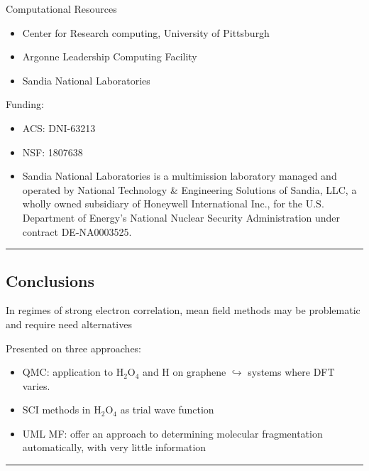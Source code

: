 \documentclass[
  letterpaper,
  DIV=11,
  numbers=noendperiod]{scrartcl}
\providecommand{\tightlist}{%
  \setlength{\itemsep}{0pt}\setlength{\parskip}{0pt}}\usepackage{longtable,booktabs,array}
\begin{document}
Computational Resources

\begin{itemize}
\tightlist
\item
  Center for Research computing, University of Pittsburgh
\item
  Argonne Leadership Computing Facility
\item
  Sandia National Laboratories
\end{itemize}

Funding:

\begin{itemize}
\tightlist
\item
  ACS: DNI-63213
\item
  NSF: 1807638
\item
  Sandia National Laboratories is a multimission laboratory managed and
  operated by National Technology \& Engineering Solutions of Sandia,
  LLC, a wholly owned subsidiary of Honeywell International Inc., for
  the U.S. Department of Energy's National Nuclear Security
  Administration under contract DE-NA0003525.
\end{itemize}

\begin{center}\rule{0.5\linewidth}{0.5pt}\end{center}

\hypertarget{conclusions}{%
\subsection{Conclusions}\label{conclusions}}

In regimes of strong electron correlation, mean field methods may be
problematic and require need alternatives

Presented on three approaches:

\begin{itemize}
\tightlist
\item
  QMC: application to H\(_2\)O\(_4\) and H on graphene
  \(\hookrightarrow\) systems where DFT varies.
\item
  SCI methods in H\(_2\)O\(_4\) as trial wave function
\item
  UML MF: offer an approach to determining molecular fragmentation
  automatically, with very little information
\end{itemize}

\begin{center}\rule{0.5\linewidth}{0.5pt}\end{center}
\end{document}

